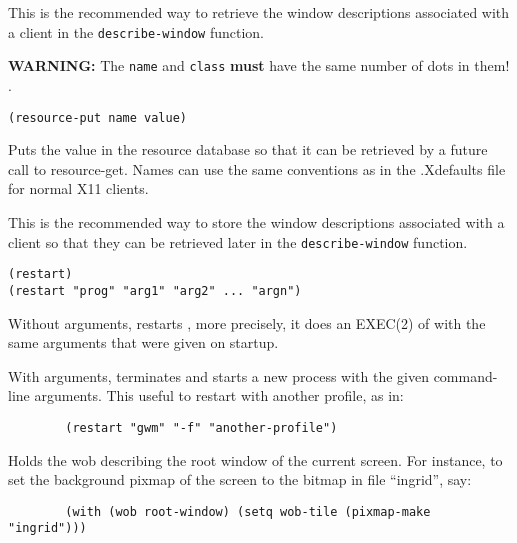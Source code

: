 This is the recommended way to retrieve the window descriptions associated
with a client in the \verb"describe-window" function.

{\bf WARNING:} The \verb"name" and \verb"class" {\bf must} have the
same number of dots in them! .

        
{\usagefont\begin{verbatim}
(resource-put name value)
\end{verbatim}}\usageupspace

Puts the value in the {\GWM} resource database so that it can be retrieved by a
future call to resource-get. Names can use the same conventions as in the
.Xdefaults file for normal X11 clients.

This is the recommended way to store the window descriptions associated with a
client so that they can be retrieved later in the \verb"describe-window"
function.

        
{\usagefont\begin{verbatim}
(restart)
(restart "prog" "arg1" "arg2" ... "argn")
\end{verbatim}}\usageupspace

Without arguments, restarts {\GWM}, more precisely, it does an EXEC(2) of
{\GWM} with the same arguments that were given on startup.

With arguments, terminates {\GWM} and starts a new process with the given
command-line arguments. This useful to restart {\GWM} with another profile,
as in:

{\exemplefont\begin{verbatim}
        (restart "gwm" "-f" "another-profile")
\end{verbatim}}

        

Holds the wob describing the root window of the current screen. 
For instance, to set the background
pixmap of the screen to the bitmap in file ``ingrid'', say:

{\exemplefont\begin{verbatim}
        (with (wob root-window) (setq wob-tile (pixmap-make "ingrid")))
\end{verbatim}}

